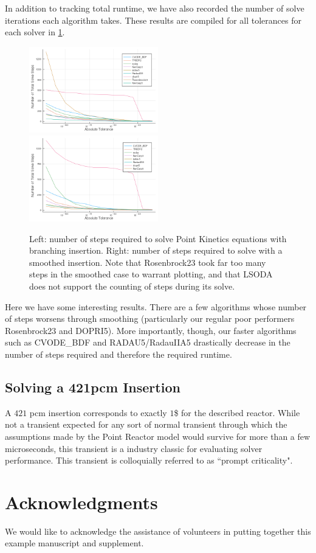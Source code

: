 \documentclass[review,onefignum,onetabnum]{siamart171218}
\begin{document}
In addition to tracking total runtime, we have also recorded the number of solve
iterations each algorithm takes. These results are compiled for all tolerances for
each solver in \cref{fig:num-steps}. \\

\begin{figure}[htb]
  \includegraphics[width=0.5\textwidth]{../plots/step-plots/stepinsert.png}
  \includegraphics[width=0.5\textwidth]{../plots/step-plots/tanhinserts.png}
  \caption{Left: number of steps required to solve Point Kinetics equations with
  branching insertion. Right: number of steps required to solve with a smoothed
  insertion. Note that Rosenbrock23 took far too many steps in the smoothed case
  to warrant plotting, and that LSODA does not support the counting of steps during
  its solve.}
  \label{fig:num-steps}
\end{figure}

Here we have some interesting results. There are a few algorithms whose number of
steps worsens through smoothing (particularly our regular poor performers Rosenbrock23
and DOPRI5). More importantly, though, our faster algorithms such as CVODE\_BDF and
RADAU5/RadauIIA5 drastically decrease in the number of steps required and therefore
the required runtime.

\subsection{Solving a 421pcm Insertion}
A $421$ pcm insertion corresponds to exactly $1$\$ for the described reactor.
While not a transient expected for any sort of normal transient through which the
assumptions made by the Point Reactor model would survive for more than a few microseconds,
this transient is a industry classic for evaluating solver performance. This transient
is colloquially referred to as ``prompt criticality".



\section*{Acknowledgments}
We would like to acknowledge the assistance of volunteers in putting
together this example manuscript and supplement.



\end{document}
